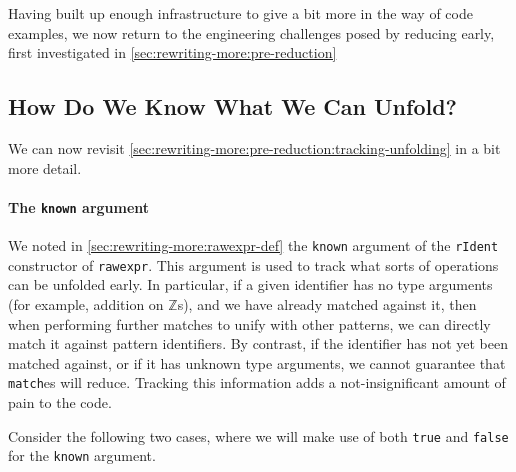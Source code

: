 Having built up enough infrastructure to give a bit more in the way of code examples, we now return to the engineering challenges posed by reducing early, first investigated in \autoref{sec:rewriting-more:pre-reduction}


\subsection{How Do We Know What We Can Unfold?}\label{sec:rewriting-more:pre-reduction-again:tracking-unfolding}
We can now revisit \autoref{sec:rewriting-more:pre-reduction:tracking-unfolding} in a bit more detail.

\paragraph{The \texttt{known} argument}\label{sec:rewriting-more:rIdent-known}
We noted in \autoref{sec:rewriting-more:rawexpr-def} the \texttt{known} argument of the \texttt{rIdent} constructor of \texttt{rawexpr}.
This argument is used to track what sorts of operations can be unfolded early.
In particular, if a given identifier has no type arguments (for example, addition on $\mathbb{Z}$s), and we have already matched against it, then when performing further matches to unify with other patterns, we can directly match it against pattern identifiers.
By contrast, if the identifier has not yet been matched against, or if it has unknown type arguments, we cannot guarantee that \texttt{match}es will reduce.
Tracking this information adds a not-insignificant amount of pain to the code.

Consider the following two cases, where we will make use of both \texttt{true} and \texttt{false} for the \texttt{known} argument.

